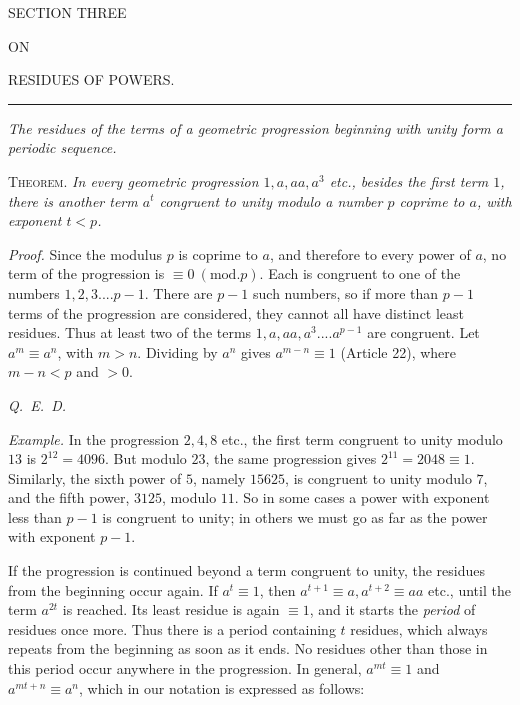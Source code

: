 \begin{center}
{\Large SECTION THREE}\par\bigskip
{\small ON}\par\bigskip
{\Large RESIDUES OF POWERS.}
\end{center}

\begin{center}\rule{0.09\linewidth}{0.3pt}\end{center}

\begin{center}\small\emph{The residues of the terms of a geometric progression beginning with unity form a periodic sequence.}\end{center}


\textsc{Theorem.} \emph{In every geometric progression $1,a,aa,a^3$ etc., besides the first term $1$, there is another term $a^t$ congruent to unity modulo a number $p$ coprime to $a$, with exponent $t<p$.}

\emph{Proof.} Since the modulus $p$ is coprime to $a$, and therefore to every power of $a$, no term of the progression is $\equiv0\ (\mathrm{mod.}p)$. Each is congruent to one of the numbers $1,2,3....p-1$. There are $p-1$ such numbers, so if more than $p-1$ terms of the progression are considered, they cannot all have distinct least residues. Thus at least two of the terms $1,a,aa,a^3....a^{p-1}$ are congruent. Let $a^m\equiv a^n$, with $m>n$. Dividing by $a^n$ gives $a^{m-n}\equiv1$ (Article 22), where $m-n<p$ and $>0$.\par
\noindent\mbox{\emph{Q. E. D.}}

\emph{Example.} In the progression $2,4,8$ etc., the first term congruent to unity modulo $13$ is $2^{12}=4096$. But modulo $23$, the same progression gives $2^{11}=2048\equiv1$. Similarly, the sixth power of $5$, namely $15625$, is congruent to unity modulo $7$, and the fifth power, $3125$, modulo $11$. So in some cases a power with exponent less than $p-1$ is congruent to unity; in others we must go as far as the power with exponent $p-1$.


If the progression is continued beyond a term congruent to unity, the residues from the beginning occur again. If $a^t\equiv1$, then $a^{t+1}\equiv a,a^{t+2}\equiv aa$ etc., until the term $a^{2t}$ is reached. Its least residue is again $\equiv1$, and it starts the \emph{period} of residues once more. Thus there is a period containing $t$ residues, which always repeats from the beginning as soon as it ends. No residues other than those in this period occur anywhere in the progression. In general, $a^{mt}\equiv1$ and $a^{mt+n}\equiv a^n$, which in our notation is expressed as follows:

